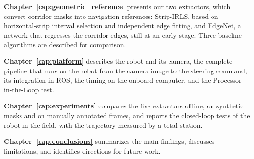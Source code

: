 \textbf{Chapter~\ref{cap:geometric_reference}} presents our two extractors, which convert corridor masks into navigation references: Strip-IRLS, based on horizontal-strip interval selection and independent edge fitting, and EdgeNet, a network that regresses the corridor edges, still at an early stage. Three baseline algorithms are described for comparison.

\textbf{Chapter~\ref{cap:platform}} describes the robot and its camera, the complete pipeline that runs on the robot from the camera image to the steering command, its integration in ROS, the timing on the onboard computer, and the Processor-in-the-Loop test.

\textbf{Chapter~\ref{cap:experiments}} compares the five extractors offline, on synthetic masks and on manually annotated frames, and reports the closed-loop tests of the robot in the field, with the trajectory measured by a total station.

\textbf{Chapter~\ref{cap:conclusions}} summarizes the main findings, discusses limitations, and identifies directions for future work.
